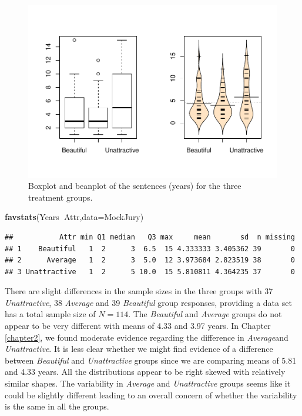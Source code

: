 \documentclass[]{book}
\newenvironment{Shaded}{\begin{snugshade}}{\end{snugshade}}
\newcommand{\KeywordTok}[1]{\textcolor[rgb]{0.13,0.29,0.53}{\textbf{#1}}}
\newcommand{\DataTypeTok}[1]{\textcolor[rgb]{0.13,0.29,0.53}{#1}}
\newcommand{\OperatorTok}[1]{\textcolor[rgb]{0.81,0.36,0.00}{\textbf{#1}}}
\newcommand{\NormalTok}[1]{#1}
\theoremstyle{definition}
\theoremstyle{definition}
\theoremstyle{remark}
\begin{document}
\begin{figure}
\centering
\includegraphics{03-oneWayAnova_files/figure-latex/Figure3-1-1.pdf}
\caption{\label{fig:Figure3-1}Boxplot and beanplot of the sentences (years) for the three
treatment groups.}
\end{figure}

\begin{Shaded}
\begin{Highlighting}[]
\KeywordTok{favstats}\NormalTok{(Years}\OperatorTok{~}\NormalTok{Attr,}\DataTypeTok{data=}\NormalTok{MockJury)}
\end{Highlighting}
\end{Shaded}

\begin{verbatim}
##           Attr min Q1 median   Q3 max     mean       sd  n missing
## 1    Beautiful   1  2      3  6.5  15 4.333333 3.405362 39       0
## 2      Average   1  2      3  5.0  12 3.973684 2.823519 38       0
## 3 Unattractive   1  2      5 10.0  15 5.810811 4.364235 37       0
\end{verbatim}

There are slight differences in the sample sizes in the three groups
with 37 \emph{Unattractive}, 38 \emph{Average} and 39 \emph{Beautiful}
group responses, providing a data set has a total sample size of
\(N=114\). The \emph{Beautiful} and \emph{Average} groups do not appear
to be very different with means of 4.33 and 3.97 years. In Chapter
\ref{chapter2}, we found moderate evidence regarding the difference in
\emph{Average}and \emph{Unattractive}. It is less clear whether we might
find evidence of a difference between \emph{Beautiful} and
\emph{Unattractive} groups since we are comparing means of 5.81 and 4.33
years. All the distributions appear to be right skewed with relatively
similar shapes. The variability in \emph{Average} and
\emph{Unattractive} groups seems like it could be slightly different
leading to an overall concern of whether the variability is the same in
all the groups.
\end{document}
